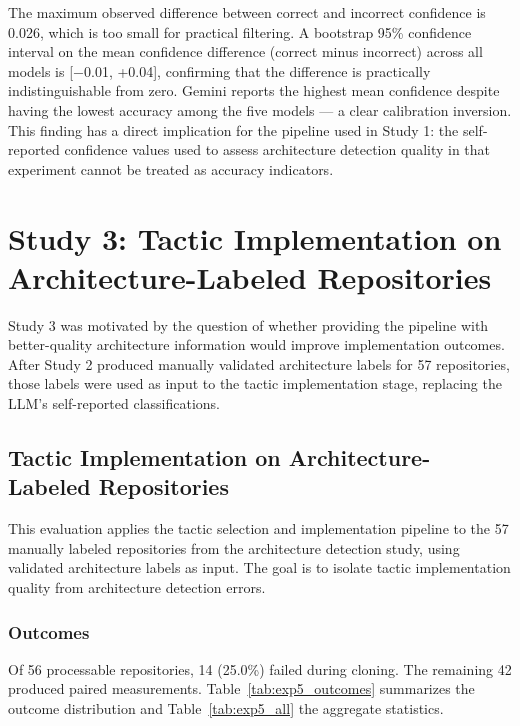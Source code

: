 The maximum observed difference between correct and incorrect confidence is 0.026, which is too small for practical filtering. A bootstrap 95\% confidence interval on the mean confidence difference (correct minus incorrect) across all models is [$-$0.01, +0.04], confirming that the difference is practically indistinguishable from zero. Gemini reports the highest mean confidence despite having the lowest accuracy among the five models — a clear calibration inversion. This finding has a direct implication for the pipeline used in Study 1: the self-reported confidence values used to assess architecture detection quality in that experiment cannot be treated as accuracy indicators.

\section{Study 3: Tactic Implementation on Architecture-Labeled Repositories}
\label{sec:eval_study3}

Study 3 was motivated by the question of whether providing the pipeline with better-quality architecture information would improve implementation outcomes. After Study 2 produced manually validated architecture labels for 57 repositories, those labels were used as input to the tactic implementation stage, replacing the LLM's self-reported classifications.

\subsection{Tactic Implementation on Architecture-Labeled Repositories}
\label{subsec:eval_tactic_impl}

This evaluation applies the tactic selection and implementation pipeline to the 57 manually labeled repositories from the architecture detection study, using validated architecture labels as input. The goal is to isolate tactic implementation quality from architecture detection errors.

\subsubsection*{Outcomes}

Of 56 processable repositories, 14 (25.0\%) failed during cloning. The remaining 42 produced paired measurements. Table~\ref{tab:exp5_outcomes} summarizes the outcome distribution and Table~\ref{tab:exp5_all} the aggregate statistics.

